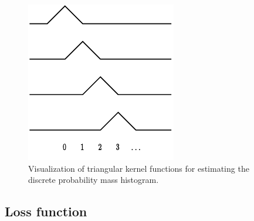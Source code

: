 
\begin{figure}[tb]
  \centering
  \includegraphics[width=0.5\linewidth]{img/pdf_compression/hist-kernels.pdf}
  \caption[Kernel functions]{%
    Visualization of triangular kernel functions for estimating the discrete probability mass histogram.%
  }
  \label{fig:pdf/kernels}
\end{figure}




\subsection{Loss function}
\label{sec:pdf_compression/loss}

